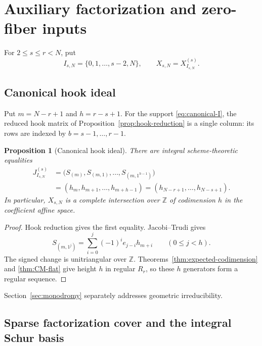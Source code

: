 \documentclass[10pt,fleqn]{article}
\numberwithin{equation}{section}
\newtheorem{proposition}[theorem]{Proposition}
\begin{document}
\section{Auxiliary factorization and zero-fiber inputs}\label{app:auxiliary-inputs}
For $2\le s\le r<N$, put
\begin{equation}\label{eq:canonical-I}
 I_{s,N}=\{0,1,\ldots,s-2,N\},\qquad X_{s,N}=X^{(s)}_{I_{s,N}}.
\end{equation}
\subsection{Canonical hook ideal}

Put $m=N-r+1$ and $h=r-s+1$.  For the support \eqref{eq:canonical-I}, the reduced hook matrix
of Proposition~\ref{prop:hook-reduction} is a single column: its rows are indexed by
$b=s-1,\ldots,r-1$.

\begin{proposition}[Canonical hook ideal]\label{prop:canonical-hook-ideal}
There are integral scheme-theoretic equalities
\begin{equation}\label{eq:canonical-hook-h}
 \begin{split}
 J_{I_{s,N}}^{(s)}
 &=\bigl(S_{(m)},S_{(m,1)},\ldots,S_{(m,1^{h-1})}\bigr)\\
 &=(h_m,h_{m+1},\ldots,h_{m+h-1})
  =(h_{N-r+1},\ldots,h_{N-s+1}).
 \end{split}
\end{equation}
In particular, $X_{s,N}$ is a complete intersection over $\mathbb Z$ of codimension $h$ in
the coefficient affine space.
\end{proposition}

\begin{proof}
Hook reduction gives the first equality.  Jacobi--Trudi gives
\begin{equation}\label{eq:hook-triangular}
 S_{(m,1^j)}=\sum_{i=0}^j(-1)^i e_{j-i}h_{m+i}\qquad(0\le j<h).
\end{equation}
The signed change is unitriangular over $\mathbb Z$.
Theorems~\ref{thm:expected-codimension} and \ref{thm:CM-flat} give
height $h$ in regular $R_r$, so these $h$ generators form a regular sequence.
\end{proof}

Section~\ref{sec:monodromy} separately addresses geometric irreducibility.

\subsection{Sparse factorization cover and the integral Schur basis}
\label{r25:factorization:monic-basis}
\end{document}

